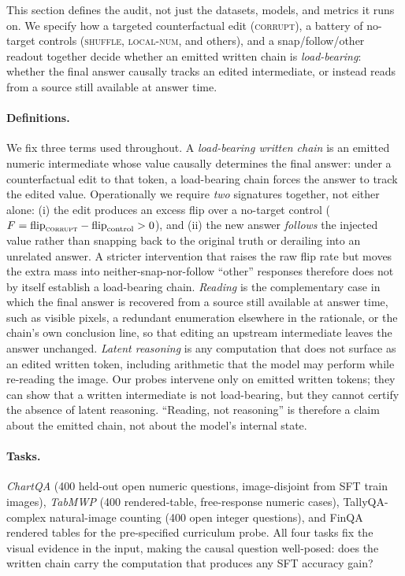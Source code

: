 \documentclass[11pt]{article}
\newcommand{\corrupt}{\textsc{corrupt}}
\newcommand{\shuffle}{\textsc{shuffle}}
\newcommand{\localnum}{\textsc{local-num}}
\begin{document}
This section defines the audit, not just the datasets, models, and metrics it
runs on. We specify how a targeted counterfactual edit (\corrupt{}), a battery
of no-target controls (\shuffle{}, \localnum{}, and others), and a
snap/follow/other readout together decide whether an emitted written chain is
\emph{load-bearing}: whether the final answer causally tracks an edited
intermediate, or instead reads from a source still available at answer time.

\paragraph{Definitions.}
We fix three terms used throughout. A \emph{load-bearing written chain} is
an emitted numeric intermediate whose value causally determines the final
answer: under a counterfactual edit to that token, a load-bearing chain
forces the answer to track the edited value. Operationally we require
\emph{two} signatures together, not either alone: (i) the edit produces an
excess flip over a no-target control ($F=\text{flip}_{\corrupt}-
\text{flip}_{\text{control}}>0$), and (ii) the new answer \emph{follows} the
injected value rather than snapping back to the original truth or derailing
into an unrelated answer. A stricter intervention that raises the raw flip
rate but moves the extra mass into neither-snap-nor-follow ``other''
responses therefore does not by itself establish a load-bearing chain.
\emph{Reading} is the
complementary case in which the final answer is recovered from a source
still available at answer time, such as visible pixels, a redundant enumeration
elsewhere in the rationale, or the chain's own conclusion line, so that
editing an upstream intermediate leaves the answer unchanged. \emph{Latent
reasoning} is any computation that does not surface as an edited written
token, including arithmetic that the model may perform while re-reading the
image. Our probes intervene only on emitted written tokens; they can show
that a written intermediate is not load-bearing, but they cannot certify
the absence of latent reasoning. ``Reading, not reasoning'' is therefore a
claim about the emitted chain, not about the model's internal state.

\paragraph{Tasks.}
\emph{ChartQA} \citep{chartqa} (400 held-out open numeric questions, image-disjoint from SFT train images), \emph{TabMWP} \citep{tabmwp} (400 rendered-table, free-response numeric cases), TallyQA-complex natural-image counting (400 open integer questions), and FinQA rendered tables for the pre-specified curriculum probe. All four tasks fix the visual evidence in the input, making the causal question well-posed: does the written chain carry the computation that produces any SFT accuracy gain?
\end{document}
